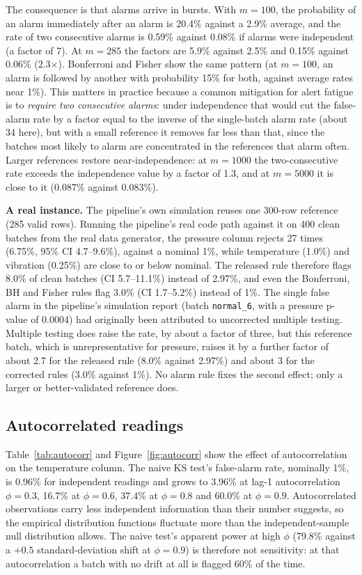 \documentclass[11pt]{article}
\begin{document}
The consequence is that alarms arrive in bursts. With $m=100$, the probability of an alarm immediately after an alarm is 20.4\% against a 2.9\% average, and the rate of two consecutive alarms is 0.59\% against 0.08\% if alarms were independent (a factor of 7). At $m=285$ the factors are 5.9\% against 2.5\% and 0.15\% against 0.06\% (2.3$\times$). Bonferroni and Fisher show the same pattern (at $m=100$, an alarm is followed by another with probability 15\% for both, against average rates near 1\%). This matters in practice because a common mitigation for alert fatigue is to \emph{require two consecutive alarms}: under independence that would cut the false-alarm rate by a factor equal to the inverse of the single-batch alarm rate (about 34 here), but with a small reference it removes far less than that, since the batches most likely to alarm are concentrated in the references that alarm often. Larger references restore near-independence: at $m=1000$ the two-consecutive rate exceeds the independence value by a factor of 1.3, and at $m=5000$ it is close to it (0.087\% against 0.083\%).

\textbf{A real instance.} The pipeline's own simulation reuses one 300-row reference (285 valid rows). Running the pipeline's real code path against it on 400 clean batches from the real data generator, the pressure column rejects 27 times (6.75\%, 95\% CI 4.7--9.6\%), against a nominal 1\%, while temperature (1.0\%) and vibration (0.25\%) are close to or below nominal. The released rule therefore flags 8.0\% of clean batches (CI 5.7--11.1\%) instead of 2.97\%, and even the Bonferroni, BH and Fisher rules flag 3.0\% (CI 1.7--5.2\%) instead of 1\%. The single false alarm in the pipeline's simulation report (batch \texttt{normal\_6}, with a pressure p-value of 0.0004) had originally been attributed to uncorrected multiple testing. Multiple testing does raise the rate, by about a factor of three, but this reference batch, which is unrepresentative for pressure, raises it by a further factor of about 2.7 for the released rule (8.0\% against 2.97\%) and about 3 for the corrected rules (3.0\% against 1\%). No alarm rule fixes the second effect; only a larger or better-validated reference does.

\subsection{Autocorrelated readings}
\label{sec:autocorr}

Table~\ref{tab:autocorr} and Figure~\ref{fig:autocorr} show the effect of autocorrelation on the temperature column. The naive KS test's false-alarm rate, nominally 1\%, is 0.96\% for independent readings and grows to 3.96\% at lag-1 autocorrelation $\phi=0.3$, 16.7\% at $\phi=0.6$, 37.4\% at $\phi=0.8$ and 60.0\% at $\phi=0.9$. Autocorrelated observations carry less independent information than their number suggests, so the empirical distribution functions fluctuate more than the independent-sample null distribution allows. The naive test's apparent power at high $\phi$ (79.8\% against a $+0.5$ standard-deviation shift at $\phi=0.9$) is therefore not sensitivity: at that autocorrelation a batch with no drift at all is flagged 60\% of the time.
\end{document}
